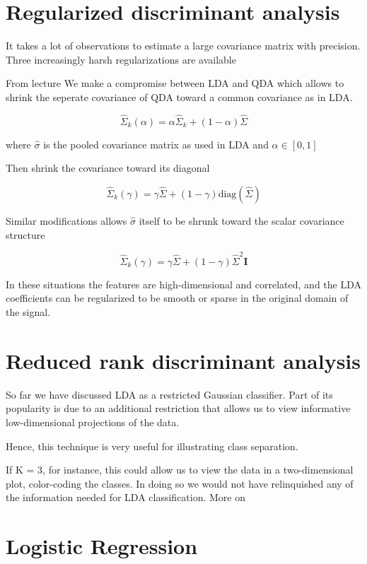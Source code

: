 \section{Regularized discriminant analysis}

It takes a lot of observations to estimate a large covariance matrix
with precision. Three increasingly harsh regularizations are available

From lecture \cite[p.~15]{lecture4} We make a compromise between LDA and QDA which allows to shrink the seperate covariance of QDA toward a common covariance as in LDA.

\[
    \hat{\Sigma}_k (\alpha) = \alpha \hat{\Sigma}_k + (1 - \alpha) \hat{\Sigma}
\]

where $\hat{\sigma}$ is the pooled covariance matrix as used in LDA and $\alpha \in [0, 1]$

Then shrink the covariance toward its diagonal

\[
    \hat{\Sigma}_k ( \gamma) = \gamma \hat{\Sigma} + (1 - \gamma) \text{diag}(\hat{\Sigma})
\]

Similar modifications allows $\hat{\sigma}$ itself to be shrunk toward the scalar covariance structure

\[
    \hat{\Sigma}_k ( \gamma) = \gamma \hat{\Sigma} + (1 - \gamma)\hat{\Sigma}^2 \bm{I}
\]

In these situations the features are high-dimensional and correlated, and the LDA coefficients can be regularized to be smooth or sparse in the original domain of the signal.

\section{Reduced rank discriminant analysis}

So far we have discussed LDA as a restricted Gaussian classifier. Part of its popularity is due to an additional restriction that allows us to view informative low-dimensional projections of the data.

Hence, this technique is very useful for illustrating class separation.

If K = 3, for instance, this could allow us to view the data in a two-dimensional plot, color-coding the classes. In doing so we would not have relinquished any of the information needed for LDA classification. More on \cite[p.~114]{friedman2016elements}

\section{Logistic Regression}


